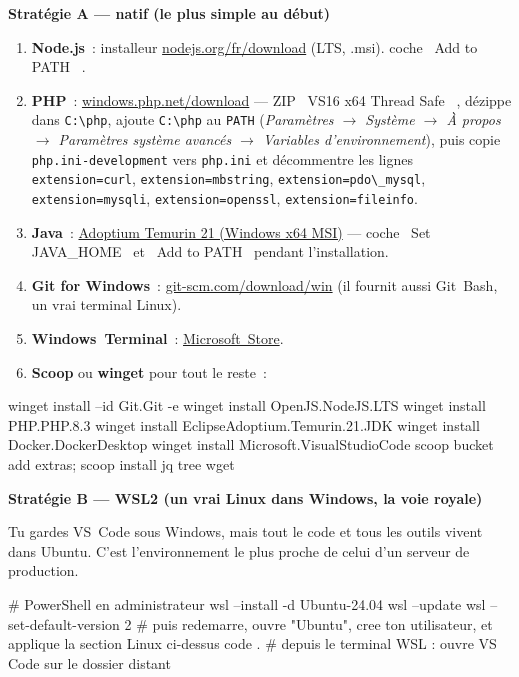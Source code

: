 \documentclass[12pt,a4paper,twoside,openright]{book}
\newcommand{\fichier}[1]{\texttt{\color{pathgreen}#1}}
\newcommand{\link}[2]{\href{#2}{#1}}
\newcommand{\etape}[1]{\par\medskip\noindent\textbf{\large #1}\par\smallskip}
\begin{document}
\etape{Strat\'egie A --- natif (le plus simple au d\'ebut)}
\begin{enumerate}
  \item \textbf{Node.js}~: installeur \link{nodejs.org/fr/download}{https://nodejs.org/fr/download}
        (LTS, .msi). coche \og ~Add to PATH~ \fg{}.
  \item \textbf{PHP}~: \link{windows.php.net/download}{https://windows.php.net/download/}
        --- ZIP \og ~VS16 x64 Thread Safe~ \fg{}, d\'ezippe dans \fichier{C:\textbackslash php}, ajoute
        \fichier{C:\textbackslash php} au \verb|PATH| (\emph{Param\`etres $\rightarrow$ Syst\`eme $\rightarrow$ \`A propos $\rightarrow$ Param\`etres
        syst\`eme avanc\'es $\rightarrow$ Variables d'environnement}), puis copie \fichier{php.ini-development}
        vers \fichier{php.ini} et d\'ecommentre les lignes
        \verb|extension=curl|, \verb|extension=mbstring|, \verb|extension=pdo\_mysql|,
        \verb|extension=mysqli|, \verb|extension=openssl|, \verb|extension=fileinfo|.
  \item \textbf{Java}~: \link{Adoptium Temurin 21 (Windows x64 MSI)}{https://adoptium.net/temurin/releases/?os=windows} ---
        coche \og ~Set JAVA\_HOME~ \fg{} et \og ~Add to PATH~ \fg{} pendant l'installation.
  \item \textbf{Git for Windows}~: \link{git-scm.com/download/win}{https://git-scm.com/download/win}
        (il fournit aussi Git~Bash, un vrai terminal Linux).
  \item \textbf{Windows~Terminal}~: \link{Microsoft~Store}{https://apps.microsoft.com/detail/9N0DX20HK701}.
  \item \textbf{Scoop} ou \textbf{winget} pour tout le reste~:
\end{enumerate}

\begin{terminal}
winget install --id Git.Git -e
winget install OpenJS.NodeJS.LTS
winget install PHP.PHP.8.3
winget install EclipseAdoptium.Temurin.21.JDK
winget install Docker.DockerDesktop
winget install Microsoft.VisualStudioCode
scoop bucket add extras; scoop install jq tree wget
\end{terminal}

\etape{Strat\'egie B --- WSL2 (un vrai Linux dans Windows, la voie royale)}
Tu gardes VS~Code sous Windows, mais tout le code et tous les outils vivent dans Ubuntu.
C'est l'environnement le plus proche de celui d'un serveur de production.

\begin{terminal}
# PowerShell en administrateur
wsl --install -d Ubuntu-24.04
wsl --update
wsl --set-default-version 2
# puis redemarre, ouvre "Ubuntu", cree ton utilisateur, et applique la section Linux ci-dessus
code .        # depuis le terminal WSL : ouvre VS Code sur le dossier distant
\end{terminal}
\end{document}
